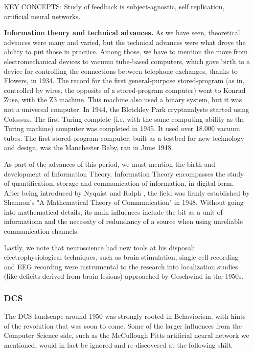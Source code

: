 \documentclass[../main.tex]{subfiles}
\begin{document}
KEY CONCEPTS: Study of feedback is subject-agnostic, self replication, artificial neural networks.

\vspace{4pt}
\textbf{Information theory and technical advances.} As we have seen, theoretical advances were many and varied, but the technical advances were what drove the ability to put those in practice. Among those, we have to mention the move from electromechanical devices to vacuum tube-based computers, which gave birth to a device for controlling the connections between telephone exchanges, thanks to Flowers, in 1934. The record for the first general-purpose stored-program (as in, controlled by wires, the opposite of a stored-program computer) went to Konrad Zuse, with the Z3 machine. This machine also used a binary system, but it was not a universal computer. In 1944, the Bletchley Park cryptanalysts started using Colossus. The first Turing-complete (i.e. with the same computing ability as the Turing machine) computer was completed in 1945. It used over 18.000 vacuum tubes. The first stored-program computer, built as a testbed for new technology and design, was the Manchester Baby, ran in June 1948\cite{ComputerResurrectionIssue2012}.

As part of the advances of this period, we must mention the birth and development of Information Theory. Information Theory encompasses the study of quantification, storage and communication of information, in digital form. After being introduced by Nyquist and Ralph \cite{nyquistCertainTopicsTelegraph1928}, the field was firmly established by Shannon's "A Mathematical Theory of Communication" in 1948. Without going into mathematical details, its main influences include the bit as a unit of informationa and the necessity of redundancy of a source when using unreliable communication channels.

Lastly, we note that neuroscience had new tools at his disposal: electrophysiological techniques, such as brain stimulation, single cell recording and EEG recording \cite{InternationalEncyclopediaSocial} were instrumental to the research into localization studies (like deficits derived from brain lesions) approached by Geschwind in the 1950s.

\subsubsection{DCS}
The DCS landscape around 1950 was strongly rooted in Behaviorism, with hints of the revolution that was soon to come. Some of the larger influences from the Computer Science side, such as the McCullough Pitts artificial neural network we mentioned, would in fact be ignored and re-discovered at the following shift.
\end{document}
